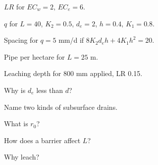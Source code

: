 \begin{exlist}
\item $LR$ for $EC_w=2$, $EC_e=6$.
\item $q$ for $L=40$, $K_2=0.5$, $d_e=2$, $h=0.4$, $K_1=0.8$.
\item Spacing for $q=5$ mm/d if $8K_2d_eh+4K_1h^2=20$.
\item Pipe per hectare for $L=25$ m.
\item Leaching depth for 800 mm applied, LR 0.15.\exans{120 mm}
\item Why is $d_e$ less than $d$?
\item Name two kinds of subsurface drains.
\item What is $r_0$?
\item How does a barrier affect $L$?
\item Why leach?
\end{exlist}
